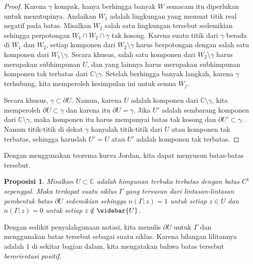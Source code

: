 \documentclass[12pt,openany]{book}
\newcommand{\C}{{\mathbb{C}}}
\newcommand{\myindex}[1]{#1\index{#1}}
\theoremstyle{plain}
\newtheorem{prop}[thm]{Proposisi}
\theoremstyle{remark}
\theoremstyle{definition}
\theoremstyle{exercise}
\theoremstyle{example}
\begin{document}
\begin{proof}
Karena $\gamma$ kompak, hanya berhingga banyak $W$ semacam itu diperlukan
untuk menutupinya.
Andaikan $W_1$ adalah lingkungan yang memuat titik real negatif pada
batas. Misalkan $W_2$ salah satu lingkungan tersebut sedemikian sehingga
perpotongan $W_1 \cap W_2 \cap \gamma$ tak kosong. Karena suatu titik dari $\gamma$
berada di $W_1$ dan $W_2$, setiap komponen dari $W_2 \setminus \gamma$
harus berpotongan dengan salah satu komponen dari $W_1 \setminus \gamma$. Secara
khusus,
salah satu komponen dari $W_2 \setminus \gamma$ harus merupakan subhimpunan $U$,
dan yang lainnya harus merupakan subhimpunan komponen tak terbatas dari $\C \setminus
\gamma$. Setelah berhingga banyak langkah, karena $\gamma$ terhubung, kita memperoleh
kesimpulan ini untuk semua $W_j$.

Secara khusus, $\gamma \subset \partial U$. Namun, karena $U$ adalah komponen dari $\C
\setminus \gamma$, kita memperoleh $\partial U \subset \gamma$ dan karena itu $\partial U =
\gamma$.
Jika $U'$ adalah sembarang komponen dari $\C \setminus \gamma$, maka komponen itu harus
mempunyai batas tak kosong dan $\partial U' \subset \gamma$. Namun titik-titik
di dekat $\gamma$ hanyalah titik-titik dari $U$ atau komponen tak terbatas, sehingga haruslah
$U' = U$ atau $U'$ adalah komponen tak terbatas.
\end{proof}

Dengan menggunakan teorema kurva Jordan, kita dapat menyusun batas-batas tersebut.

\begin{prop}
Misalkan $U \subset \C$ adalah himpunan terbuka terbatas dengan batas $C^1$
sepenggal. Maka terdapat suatu siklus $\Gamma$ yang tersusun dari lintasan-lintasan
pembentuk batas $\partial U$ sedemikian sehingga $n(\Gamma;z) = 1$ untuk setiap $z \in U$ dan
$n(\Gamma;z) = 0$ untuk setiap $z \notin \widebar{U}$.
\end{prop}

Dengan sedikit penyalahgunaan notasi, kita menulis $\partial U$ untuk $\Gamma$ dan menggunakan
batas tersebut sebagai suatu siklus.
Karena bilangan lilitannya adalah $1$ di sekitar bagian dalam, kita mengatakan bahwa batas tersebut
\emph{\myindex{berorientasi positif}}.
\end{document}
